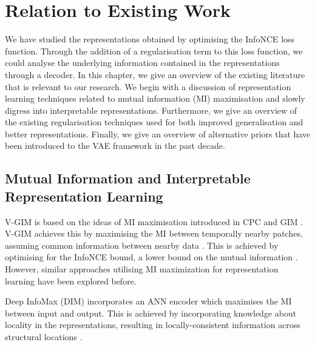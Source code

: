 \chapter{Relation to Existing Work} \label{cha:5}

We have studied the representations obtained by optimising the InfoNCE loss function. Through the addition of a regularisation term to this loss function, we could analyse the underlying information contained in the representations through a decoder. In this chapter, we give an overview of the existing literature that is relevant to our research. We begin with a discussion of representation learning techniques related to mutual information (MI) maximisation and slowly digress into interpretable representations. Furthermore, we give an overview of the existing regularisation techniques used for both improved generalisation and better representations. Finally, we give an overview of alternative priors that have been introduced to the VAE framework in the past decade.



\section{Mutual Information and Interpretable Representation Learning}
	V-GIM is based on the ideas of MI maximisation introduced in CPC and GIM \citep{lowePuttingEndEndtoEnd2020a, oordRepresentationLearningContrastive2019}. V-GIM achieves this by maximising the MI between temporally nearby patches, assuming common information between nearby data \citep{lowePuttingEndEndtoEnd2020a}. This is achieved by optimising for the InfoNCE bound, a lower bound on the mutual information \cite{oordRepresentationLearningContrastive2019}. However, similar approaches utilising MI maximization for representation learning have been explored before.
		
	Deep InfoMax (DIM) incorporates an ANN encoder which maximises the MI between input and output. This is achieved by incorporating knowledge about locality in the representations, resulting in locally-consistent information across structural locations \citep{hjelmLearningDeepRepresentations2019}. 
	
